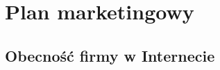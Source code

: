 \documentclass[12pt]{article}
\begin{document}

\section{Plan marketingowy}






\subsection{Obecność firmy w Internecie} %
\end{document}
